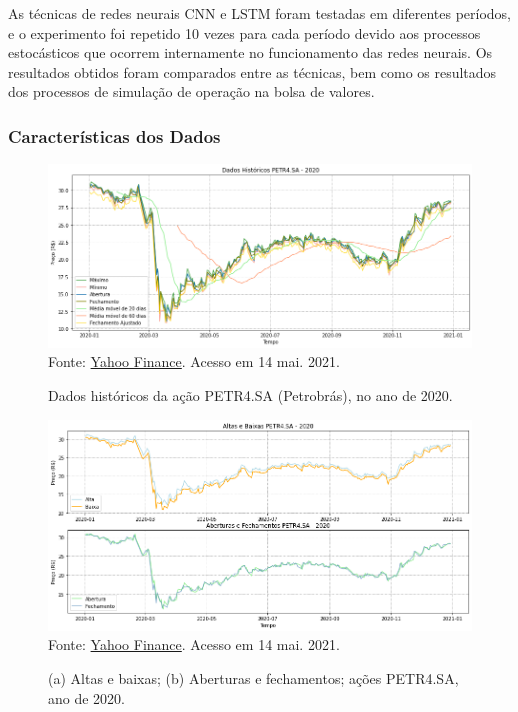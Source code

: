 \par
As técnicas de redes neurais CNN e LSTM foram testadas em diferentes períodos, e o experimento foi repetido 10 vezes para cada período devido aos processos estocásticos que ocorrem internamente no funcionamento das redes neurais. Os resultados obtidos foram comparados entre as técnicas, bem como os resultados dos processos de simulação de operação na bolsa de valores.


\subsubsection{Características dos Dados}


\begin{figure}[hbt]
\centering
\caption{Dados históricos da ação PETR4.SA (Petrobrás), no ano de 2020.}
  \includegraphics[scale=0.52]{figures/img2.png}
  Fonte: \href{https://finance.yahoo.com/}{Yahoo Finance}. Acesso em 14 mai. 2021.
\end{figure}


\begin{figure}[H]
\centering
\caption{(a) Altas e baixas; (b) Aberturas e fechamentos; ações PETR4.SA, ano de 2020.}
  \includegraphics[scale=0.52]{figures/img3.png}
  Fonte: \href{https://finance.yahoo.com/}{Yahoo Finance}. Acesso em 14 mai. 2021.
\end{figure}


